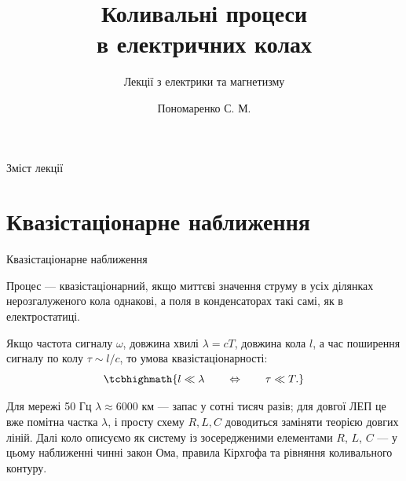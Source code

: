 \documentclass[onlytextwidth]{beamer}
\title[Лекції електрики та магнетизму]{\huge\bfseries Коливальні процеси \\ в електричних колах}
\subtitle{Лекції з електрики та магнетизму}
\author{Пономаренко С. М.}
\date{}
\begin{document}
\begin{frame}[plain]
	\maketitle
\end{frame}

\begin{frame}{Зміст лекції}{}
	\tableofcontents
\end{frame}

\section{Квазістаціонарне наближення}

\begin{frame}{Квазістаціонарне наближення}{}
	\begin{block}{}\justifying
		Процес --- \alert{квазістаціонарний}, якщо миттєві значення струму в усіх ділянках нерозгалуженого кола однакові, а поля в конденсаторах такі самі, як в електростатиці.
	\end{block}
	\begin{block}{}\justifying
		Якщо частота сигналу $\omega$, довжина хвилі $\lambda = cT$, довжина кола $l$, а час поширення сигналу по колу $\tau \sim l/c$, то умова квазістаціонарності:
		\begin{equation*}
			\tcbhighmath{
				l \ll \lambda \qquad\Leftrightarrow\qquad \tau \ll T.
			}
		\end{equation*}
	\end{block}
	\begin{exampleblock}{}\justifying\small
		Для мережі 50 Гц $\lambda \approx 6000$ км --- запас у сотні тисяч разів; для довгої ЛЕП це вже помітна частка $\lambda$, і просту схему $R,L,C$ доводиться заміняти теорією довгих ліній. Далі коло описуємо як систему із \alert{зосередженими} елементами $R$, $L$, $C$ --- у цьому наближенні чинні закон Ома, правила Кірхгофа та рівняння коливального контуру.
	\end{exampleblock}
\end{frame}
\end{document}
